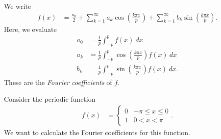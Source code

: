 \documentclass[10pt]{mypackage}
\begin{document}
\begin{example}
  We write
  \begin{align*}
    f(x) &= \frac{a_0}{2} + \sum_{k=1}^{\infty}a_k\cos\left( \frac{k\pi x}{p} \right) + \sum_{k=1}^{\infty}b_k\sin\left( \frac{k\pi x}{p} \right).
  \end{align*}
  Here, we evaluate
  \begin{align*}
    a_0 &= \frac{1}{p}\int_{-p}^{p} f(x)\:dx\\
    a_k &= \frac{1}{p}\int_{-p}^{p} \cos\left( \frac{k\pi x}{p} \right)f(x)\:dx\\
    b_k &= \frac{1}{p}\int_{-p}^{p} \sin\left( \frac{k\pi x}{p} \right)f(x)\:dx.
  \end{align*}
  These are the \textit{Fourier coefficients} of $f$.
\end{example}
\begin{example}
  Consider the periodic function
  \begin{align*}
    f(x) &= \begin{cases}
      0 & -\pi \leq x \leq 0\\
      1 & 0 < x < \pi
    \end{cases}.
  \end{align*}
  We want to calculate the Fourier coefficients for this function. 
\end{example}
\end{document}
